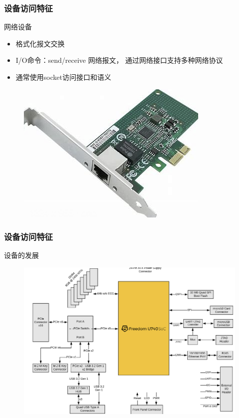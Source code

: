 % 
\begin{frame}[fragile]
    \frametitle{设备访问特征}
    网络设备
    \begin{itemize}
        \item 格式化报文交换
        \item I/O命令：send/receive 网络报文， 通过网络接口支持多种网络协议
        \item 通常使用socket访问接口和语义
    \end{itemize}
    \begin{figure}
        \includegraphics[width=0.3\linewidth]{figs/net-dev.png}
    \end{figure}
\end{frame}

\begin{frame}[fragile]
    \frametitle{设备访问特征}
    设备的发展
    \begin{figure}
        \includegraphics[width=1.\linewidth]{figs/u740-arch.png}
    \end{figure}
\end{frame}
